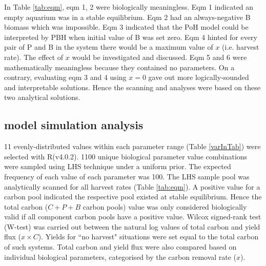 \documentclass[../thesis.tex]{subfiles} %
\begin{document}
In Table \ref{tab:eqm}, eqm 1, 2 were biologically meaningless. Eqm 1 indicated an empty aquarium was in a stable equilibrium.  Eqm 2 had an always-negative B biomass which was impossible.  Eqm 3 indicated that the PoH model could be interpreted by PBH when initial value of B was set zero.  Eqm 4 hinted for every pair of P and B in the system there would be a maximum value of $x$ (i.e. harvest rate).  The effect of $x$ would be investigated and discussed.  Eqm 5 and 6 were mathematically meaningless because they contained no parameters.  On a contrary, evaluating eqm 3 and 4 using $x=0$ gave out more logically-sounded and interpretable solutions.  Hence the scanning and analyses were based on these two analytical solutions.

\subsection{model simulation analysis}
11 evenly-distributed values within each parameter range (Table \ref{varInTab}) were selected with R(v4.0.2).  1100 unique biological parameter value combinations were sampled using LHS technique under a uniform prior.  The expected frequency of each value of each parameter was 100.  The LHS sample pool was analytically scanned for all harvest rates (Table \ref{tab:eqm}).  A positive value for a carbon pool indicated the respective pool existed at stable equilibrium.  Hence the total carbon ($C+P+B$ carbon pools) value was only considered biologically valid if all component carbon pools have a positive value.
Wilcox signed-rank test (W-test) was carried out between the natural log values of total carbon and yield flux ($x\times C$).  Yields for ``no harvest" situations were set equal to the total carbon of such systems.  Total carbon and yield flux were also compared based on individual biological parameters, categorised by the carbon removal rate ($x$).
\end{document}
